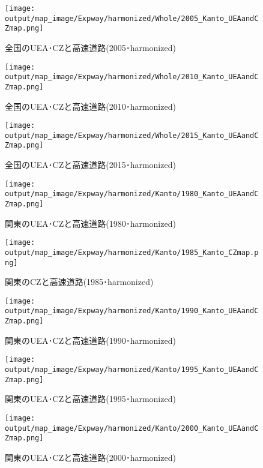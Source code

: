 \documentclass{ltjsarticle}
\begin{document}
\begin{figure}[pbth]
  \centering
  \texttt{[image: output/map\_image/Expway/harmonized/Whole/2005\_Kanto\_UEAandCZmap.png]}
  \caption{\label{ham:2005:allCZandUEA:Expway}全国のUEA･CZと高速道路(2005･harmonized)}
\end{figure}


\begin{figure}[pbth]
  \centering
  \texttt{[image: output/map\_image/Expway/harmonized/Whole/2010\_Kanto\_UEAandCZmap.png]}
  \caption{\label{ham:2010:allCZandUEA:Expway}全国のUEA･CZと高速道路(2010･harmonized)}
\end{figure}


\begin{figure}[pbth]
  \centering
  \texttt{[image: output/map\_image/Expway/harmonized/Whole/2015\_Kanto\_UEAandCZmap.png]}
  \caption{\label{ham:2015:allCZandUEA:Expway}全国のUEA･CZと高速道路(2015･harmonized)}
\end{figure}

\begin{figure}[pbth]
  \centering
  \texttt{[image: output/map\_image/Expway/harmonized/Kanto/1980\_Kanto\_UEAandCZmap.png]}
  \caption{\label{ham:1980:KanCZandUEA:Expway}関東のUEA･CZと高速道路(1980･harmonized)}
\end{figure}


\begin{figure}[pbth]
  \centering
  \texttt{[image: output/map\_image/Expway/harmonized/Kanto/1985\_Kanto\_CZmap.png]}
  \caption{\label{ham:1985:KanCZandUEA:Expway}関東のCZと高速道路(1985･harmonized)}
\end{figure}


\begin{figure}[pbth]
  \centering
  \texttt{[image: output/map\_image/Expway/harmonized/Kanto/1990\_Kanto\_UEAandCZmap.png]}
  \caption{\label{ham:1990:KanCZandUEA:Expway}関東のUEA･CZと高速道路(1990･harmonized)}
\end{figure}


\begin{figure}[pbth]
  \centering
  \texttt{[image: output/map\_image/Expway/harmonized/Kanto/1995\_Kanto\_UEAandCZmap.png]}
  \caption{\label{ham:1995:KanCZandUEA:Expway}関東のUEA･CZと高速道路(1995･harmonized)}
\end{figure}


\begin{figure}[pbth]
  \centering
  \texttt{[image: output/map\_image/Expway/harmonized/Kanto/2000\_Kanto\_UEAandCZmap.png]}
  \caption{\label{ham:2000:KanCZandUEA:Expway}関東のUEA･CZと高速道路(2000･harmonized)}
\end{figure}
\end{document}
